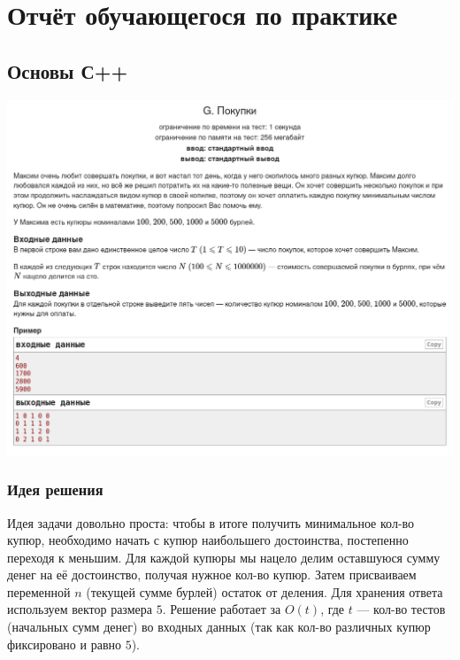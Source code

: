 %
%

\section{Отчёт обучающегося по практике}

\subsection*{Основы С++}
\begin{center}
\includegraphics[width=\textwidth]{statements/20220630/G.png}
\end{center}
\subsubsection*{Идея решения}

Идея задачи довольно проста: чтобы в итоге получить минимальное кол-во купюр, необходимо начать с купюр наибольшего достоинства, постепенно переходя к меньшим. Для каждой купюры мы нацело делим оставшуюся сумму денег на её достоинство, получая нужное кол-во купюр. Затем присваиваем переменной $n$ (текущей сумме бурлей) остаток от деления. Для хранения ответа используем вектор размера $5$. Решение работает за $O(t)$, где $t$ --- кол-во тестов (начальных сумм денег) во входных данных (так как кол-во различных купюр фиксировано и равно $5$).

